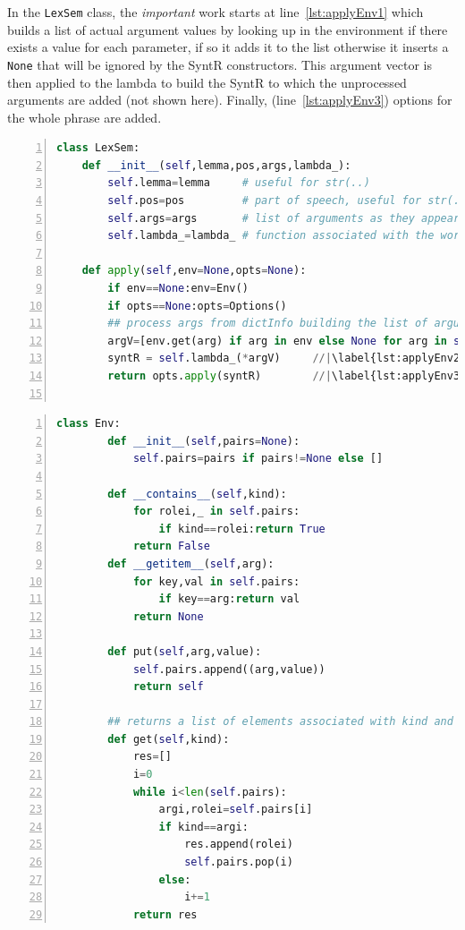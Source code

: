 \documentclass[12pt]{article}
\newcommand{\representation}[1]{\textsf{#1}}
\newcommand{\SYNTR}{\representation{SyntR}}
\begin{document}
In the \lstinline{LexSem} class, the \emph{important} work starts at line~\ref{lst:applyEnv1} which builds a list of actual argument values by looking up in the environment if there exists a value for each parameter, if so it adds it to the list otherwise it inserts a \texttt{None} that will be ignored by the \SYNTR{} constructors. This argument vector is then applied to the lambda to build the \SYNTR{} to which the unprocessed arguments are added (not shown here). Finally, (line~\ref{lst:applyEnv3}) options for the whole phrase are added.


\begin{lstlisting}[language=Python,basicstyle=\ttfamily\footnotesize,
                   numbers=left,numbersep=5pt,numberstyle=\tiny,
                   aboveskip=\medskipamount,float=ht,
                   caption={Core of the lambda application in Python.},
                   label=lst:LexSem]
class LexSem:
    def __init__(self,lemma,pos,args,lambda_):
        self.lemma=lemma     # useful for str(..)
        self.pos=pos         # part of speech, useful for str(...)
        self.args=args       # list of arguments as they appear in the AMR
        self.lambda_=lambda_ # function associated with the word
        
    def apply(self,env=None,opts=None):
        if env==None:env=Env()
        if opts==None:opts=Options()
        ## process args from dictInfo building the list of arguments or None
        argV=[env.get(arg) if arg in env else None for arg in self.args] //|\label{lst:applyEnv1} 
        syntR = self.lambda_(*argV)     //|\label{lst:applyEnv2} 
        return opts.apply(syntR)        //|\label{lst:applyEnv3} 
   
\end{lstlisting}

\begin{lstlisting}[language=Python,basicstyle=\ttfamily\footnotesize,
                   numbers=left,numbersep=5pt,numberstyle=\tiny,
                   aboveskip=\medskipamount,float=ht,
                   caption={Environment representation.},
                   label=lst:Env]
    class Env:
        def __init__(self,pairs=None):
            self.pairs=pairs if pairs!=None else []

        def __contains__(self,kind):
            for rolei,_ in self.pairs:
                if kind==rolei:return True
            return False
        def __getitem__(self,arg):
            for key,val in self.pairs:
                if key==arg:return val
            return None

        def put(self,arg,value):
            self.pairs.append((arg,value))
            return self

        ## returns a list of elements associated with kind and remove them from the environment 
        def get(self,kind):
            res=[]
            i=0
            while i<len(self.pairs):
                argi,rolei=self.pairs[i]
                if kind==argi:
                    res.append(rolei)
                    self.pairs.pop(i)
                else:
                    i+=1            
            return res
\end{lstlisting}
\end{document}
